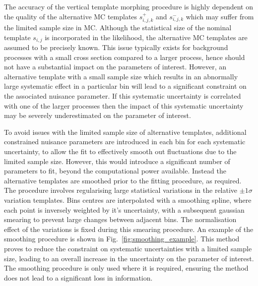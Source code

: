 The accuracy of the vertical template morphing procedure is highly dependent on the quality of the alternative MC templates $s_{i,j,k}^+$ and $s_{i,j,k}^-$ which may suffer from the limited sample size in MC. Although the statistical size of the nominal template $s_{i,j}$ is incorporated in the likelihood, the alternative MC templates are assumed to be precisely known. This issue typically exists for background processes with a small cross section compared to a larger process, hence should not have a substantial impact on the parameters of interest. However, an alternative template with a small sample size which results in an abnormally large systematic effect in a particular bin will lead to a significant constraint on the associated nuisance parameter. If this systematic uncertainty is correlated with one of the larger processes then the impact of this systematic uncertainty may be severely underestimated on the parameter of interest.

To avoid issues with the limited sample size of alternative templates, additional constrained nuisance parameters are introduced in each bin for each systematic uncertainty, to allow the fit to effectively smooth out fluctuations due to the limited sample size. However, this would introduce a significant number of parameters to fit, beyond the computational power available. Instead the alternative templates are smoothed prior to the fitting procedure, as required. The procedure involves regularising large statistical variations in the relative $\pm 1\sigma$ variation templates. Bins centres are interpolated with a smoothing spline, where each point is inversely weighted by it's uncertainty, with a subsequent gaussian smearing to prevent large changes between adjacent bins. The normalisation effect of the variations is fixed during this smearing procedure. An example of the smoothing procedure is shown in Fig.~\ref{fig:smoothing_example}. This method proves to reduce the constraint on systematic uncertainties with a limited sample size, leading to an overall increase in the uncertainty on the parameter of interest. The smoothing procedure is only used where it is required, ensuring the method does not lead to a significant loss in information.

